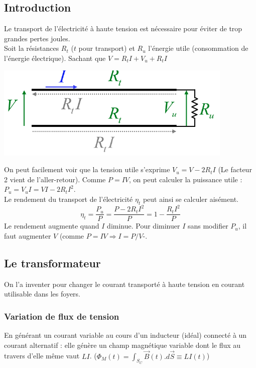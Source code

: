 \documentclass	[11pt, a4paper, openany]{book}
\begin{document}
\subsection{Introduction}
Le transport de l'électricité à haute tension est nécessaire pour éviter de trop grandes pertes joules.\\
Soit la résistances $R_t$ ($t$ pour transport) et $R_u$ l'énergie utile (consommation de l'énergie électrique). Sachant que $V = R_tI + V_u + R_tI$

\begin{center}
	\includegraphics[scale=0.45]{em/image25.png}\\
\end{center}
On peut facilement voir que la tension utile s'exprime $V_u = V - 2 R_tI$ (Le facteur 2 vient de l'aller-retour). Comme $P = IV$, on peut calculer la puissance utile : $P_u = V_uI = VI - 2R_tI^2$.\\
Le rendement du transport de l'électricité $\eta_t$ peut ainsi se calculer aisément.
\begin{equation}
	\eta_t = \frac{P_u}{P} = \frac{P - 2R_tI^2}{P} = 1 - \frac{R_tI^2}{P}
\end{equation}
Le rendement augmente quand $I$ diminue. Pour diminuer $I$ sans modifier $P_u$, il faut augmenter $V$ (comme $P = IV \Rightarrow I = P/V$-.

\subsection{Le transformateur}
On l'a inventer pour changer le courant transporté à haute tension en courant utilisable dans les foyers.

\subsubsection{Variation de flux de tension}
En générant un courant variable au cours d'un inducteur (idéal) connecté à un courant alternatif : elle génère un champ magnétique variable dont le flux au travers d'elle même vaut $LI$. ($\Phi_M(t) = \int_{S_C} \vec{B}(t).d\vec{S} \equiv LI(t)$)\\
\end{document}
